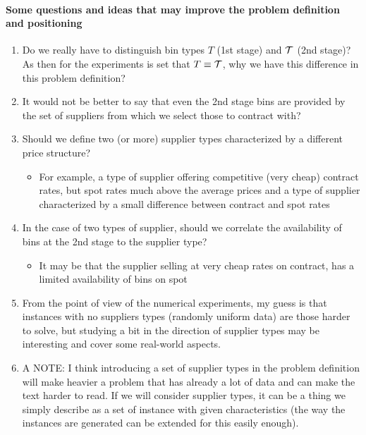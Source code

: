\documentclass[a4paper,11pt]{article}
\begin{document}
	{
	\color{red}
	\paragraph*{Some questions and ideas that may improve the problem definition and positioning}
	\begin{enumerate}
		\item Do we really have to distinguish bin types $ T$ (1st stage) and $\cal T $ (2nd stage)? As then for the experiments is set that $ T \equiv {\cal T}$, why we have this difference in this problem definition?
		
		\item It would not be better to say that even the 2nd stage bins are provided by the set of suppliers from which we select those to contract with?
		
		\item Should we define two (or more) supplier types characterized by a different price structure? \\
		\begin{itemize}
			\item For example, a type of supplier offering competitive (very cheap) contract rates, but spot rates much above the average prices and a type of supplier characterized by a small difference between contract and spot rates
		\end{itemize}
		\item In the case of two types of supplier, should we correlate the availability of bins at the 2nd stage to the supplier type?
		\begin{itemize}
			\item It may be that the supplier selling at very cheap rates on contract, has a limited availability of bins on spot
		\end{itemize}
		\item From the point of view of the numerical experiments, my guess is that instances with no suppliers types (randomly uniform data) are those harder to solve, but studying a bit in the direction of supplier types may be interesting and cover some real-world aspects.
		
		\item A NOTE:
		I think introducing a set of supplier types in the problem definition will make heavier a problem that has already a lot of data and can make the text harder to read.
		If we will consider supplier types, it can be a thing we simply describe as a set of instance with given characteristics (the way the instances are generated can be extended for this easily enough).
	\end{enumerate}
	}
	
\end{document}
